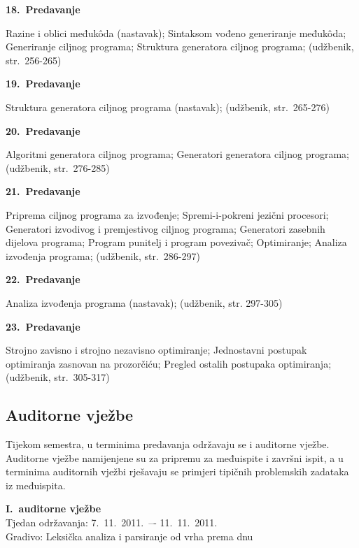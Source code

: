 \documentclass[times, 12pt, utf8]{book}
\newenvironment{myindentpar}[1]%
{\begin{list}{}%
         {\setlength{\leftmargin}{#1}}%
         \item[]%
}
{\end{list}}
\begin{document}
\textbf{18.~Predavanje}
\begin{myindentpar}{30pt}
Razine i oblici međukôda (nastavak); Sintaksom vođeno generiranje međukôda; Generiranje ciljnog programa; Struktura generatora ciljnog programa; (udžbenik, str.~256-265)
\end{myindentpar}

\textbf{19.~Predavanje}
\begin{myindentpar}{30pt}
Struktura generatora ciljnog programa (nastavak); (udžbenik, str.~265-276) 
\end{myindentpar}

\textbf{20.~Predavanje}
\begin{myindentpar}{30pt}
Algoritmi generatora ciljnog programa; Generatori generatora ciljnog programa; (udžbenik, str.~276-285) 
\end{myindentpar}

\textbf{21.~Predavanje}
\begin{myindentpar}{30pt}
Priprema ciljnog programa za izvođenje; Spremi-i-pokreni jezični procesori; Generatori izvodivog i premjestivog ciljnog programa; Generatori zasebnih dijelova programa; Program punitelj i program povezivač; Optimiranje; Analiza izvođenja programa; (udžbenik, str.~286-297)
\end{myindentpar}

\textbf{22.~Predavanje}
\begin{myindentpar}{30pt}
Analiza izvođenja programa (nastavak); (udžbenik, str. 297-305)
\end{myindentpar}

\textbf{23.~Predavanje}
\begin{myindentpar}{30pt}
Strojno zavisno i strojno nezavisno optimiranje; Jednostavni postupak optimiranja zasnovan na prozorčiću; Pregled ostalih postupaka optimiranja; (udžbenik, str.~305-317)
\end{myindentpar}

\cleardoublepage  
{}  
{}
\subsection*{Auditorne vježbe}

Tijekom semestra, u terminima predavanja održavaju se i auditorne vježbe.
Auditorne vježbe namijenjene su za pripremu za međuispite i završni ispit, a u terminima auditornih vježbi rješavaju se primjeri tipičnih problemskih zadataka iz međuispita.

\textbf{I.~auditorne vježbe} \\
Tjedan održavanja: 7.~11.~2011.~–- 11.~11.~2011. \\
Gradivo: Leksička analiza i parsiranje od vrha prema dnu
\end{document}
